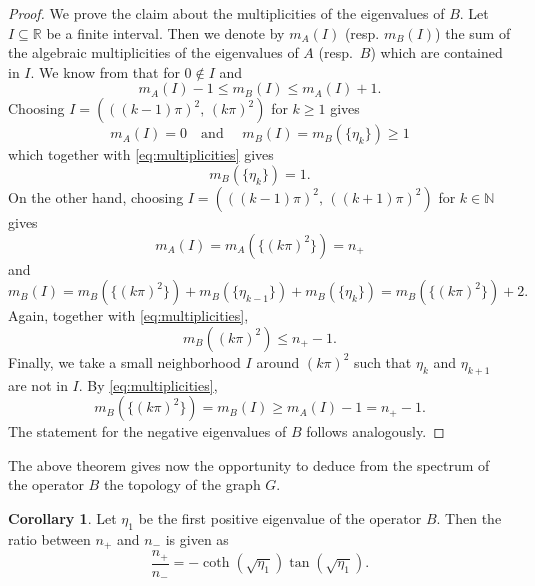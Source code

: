 \documentclass{article}
\numberwithin{equation}{section}
\theoremstyle{definition}
\newtheorem{corollary}[theorem]{Corollary}
\newcommand{\R}{\mathbb{R}}
\newcommand{\N}{\mathbb{N}}
\newcommand{\AK}{A}
\newcommand{\AKone}{B}
\begin{document}
\begin{proof}
   We prove the claim about the multiplicities of the eigenvalues of $\AKone$. Let $I\subseteq \R$ be a finite interval. Then we denote by $m_{A}(I)$ (resp. $m_{B}(I)$) the sum of the algebraic multiplicities of the eigenvalues of $A$ (resp.\ $B$) which are contained in $I$. We know from \cite{BLMMT2016} 
   that for $0\notin I$ and
   \begin{equation}
   \label{eq:multiplicities}
   	m_{\AK}(I) - 1 \le  m_{\AKone}(I) \le  m_{\AK}(I) + 1.
   \end{equation}
   Choosing $I=( ((k-1)\pi )^2,\, (k\pi)^2)$ for $k\ge 1$ gives
   \begin{equation*}
   	m_{\AK}(I) =0\quad \mbox{and }\quad m_{\AKone}(I) = m_{\AKone}(\{\eta_k\}) \ge 1
   \end{equation*}
   which together with \eqref{eq:multiplicities} gives 
   \begin{equation*}
   	m_{\AKone}(\{\eta_k\}) = 1.
   \end{equation*}
   On the other hand, choosing $I=( ((k-1)\pi )^2,\, ( (k+1)\pi)^2)$ for $k\in\N$ gives
   \begin{equation*}
   	m_{\AK}(I) = m_{\AK}(\{(k\pi)^2\}) = n_+
   \end{equation*}
   and
   \begin{equation*}
   	m_{\AKone}(I) = m_{\AKone}(\{(k\pi)^2\}) + m_{\AKone}(\{\eta_{k-1}\})  + m_{\AKone}(\{\eta_k\}) = m_{\AKone}(\{(k\pi)^2\}) + 2.
   \end{equation*}
   Again, together with \eqref{eq:multiplicities},
   \begin{equation*}
   	m_{\AKone}((k\pi)^2) \le n_+ - 1.
   \end{equation*}
   Finally, we take a small neighborhood $I$ around $(k\pi)^2$ such that $\eta_k$ and $\eta_{k+1}$ are not in $I$. By \eqref{eq:multiplicities},
   \begin{equation*}
   	m_{\AKone}(\{(k\pi)^2\})=m_B(I)\geq   m_{\AK}(I) - 1 = n_+ - 1.
   \end{equation*}
The statement for the negative eigenvalues of $B$ follows analogously.
\end{proof}
The above theorem gives now the opportunity to deduce from the spectrum of  the operator $B$ the topology of the graph $G$.
\begin{corollary}
 Let $\eta_1$ be the first positive eigenvalue of the operator $B$. Then the ratio between $n_+$ and $n_-$ is given as
 $$
 \frac{n_+}{n_-}=-\coth(\sqrt{\eta_1}) \tan(\sqrt{\eta_1}).
 $$
\end{corollary}
\end{document}
